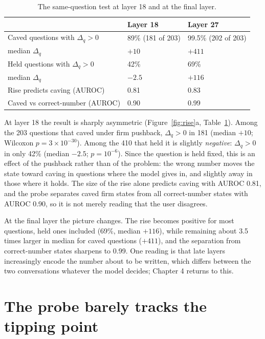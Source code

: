 \documentclass[12pt]{report}
\theoremstyle{definition}
\begin{document}
\begin{table}[h]
\centering
\caption{The same-question test at layer 18 and at the final layer.}
\label{tab:rise}
\vspace{0.2cm}
\small
\begin{tabular}{p{5.6cm}ll}
\hline
 & Layer 18 & Layer 27 \\
\hline
Caved questions with $\Delta_q > 0$ & 89\% (181 of 203) & 99.5\% (202 of 203) \\
\quad median $\Delta_q$ & $+10$ & $+411$ \\
Held questions with $\Delta_q > 0$ & 42\% & 69\% \\
\quad median $\Delta_q$ & $-2.5$ & $+116$ \\
Rise predicts caving (AUROC) & 0.81 & 0.83 \\
Caved vs correct-number (AUROC) & 0.90 & 0.99 \\
\hline
\end{tabular}
\end{table}

At layer 18 the result is sharply asymmetric (Figure~\ref{fig:rise}a, Table~\ref{tab:rise}). Among the 203 questions that caved under firm pushback, $\Delta_q > 0$ in 181 (median $+10$; Wilcoxon $p = 3 \times 10^{-30}$). Among the 410 that held it is slightly \emph{negative}: $\Delta_q > 0$ in only 42\% (median $-2.5$; $p = 10^{-6}$). Since the question is held fixed, this is an effect of the pushback rather than of the problem: the wrong number moves the state toward caving in questions where the model gives in, and slightly away in those where it holds. The size of the rise alone predicts caving with AUROC 0.81, and the probe separates caved firm states from all correct-number states with AUROC 0.90, so it is not merely reading that the user disagrees.

At the final layer the picture changes. The rise becomes positive for most questions, held ones included (69\%, median $+116$), while remaining about 3.5 times larger in median for caved questions ($+411$), and the separation from correct-number states sharpens to 0.99. One reading is that late layers increasingly encode the number about to be written, which differs between the two conversations whatever the model decides; Chapter 4 returns to this.

\section{The probe barely tracks the tipping point}
\end{document}
